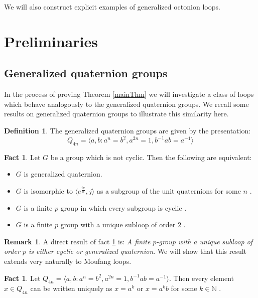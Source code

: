 \documentclass[12pt]{report}
\theoremstyle{definition}
\newtheorem{fct}[thm]{Fact}
\newtheorem{dfn}[thm]{Definition}
\newtheorem*{rmk}{Remark}
\newcommand{\NNN}{\mathbb{N}}
\begin{document}
We will also construct explicit examples of generalized octonion loops.


\section{Preliminaries}

\subsection{Generalized quaternion groups}

In the process of proving Theorem \ref{mainThm} we will investigate a class of loops which behave analogously
  to the generalized quaternion groups. We recall some results on generalized quaternion groups to illustrate
  this similarity here.

\begin{dfn}
  The generalized quaternion groups are given by the presentation:
  \[Q_{4n} = \langle a, b : a^n = b^2, a^{2n} = 1, b^{-1}ab = a^{-1}\rangle\]
\end{dfn}

\begin{fct}\label{fct:genQuat}
  Let $G$ be a group which is not cyclic. Then the following are equivalent:
  \begin{itemize}
    \item $G$ is generalized quaternion.
    \item $G$ is isomorphic to $\langle e^{\frac{i\pi}{n}}, j\rangle$ as a subgroup of the unit
      quaternions for some $n$ \cite{Brown}.
    \item $G$ is a finite $p$ group in which every subgroup is cyclic \cite{Cartan}.
    \item $G$ is a finite $p$ group with a unique subloop of order $2$ \cite{Brown}.
  \end{itemize}
\end{fct}

\begin{rmk}
  A direct result of fact \ref{fct:genQuat} is: \emph{A finite $p$-group with a unique subloop of order $p$ is
    either cyclic or generalized quaternion}. We will show that this result extends very naturally to Moufang loops.
\end{rmk}

\begin{fct}\label{fct:genQuat-rep}
  Let $Q_{4n} = \langle a, b : a^n = b^2, a^{2n} = 1, b^{-1}ab = a^{-1}\rangle$. Then every element $x \in Q_{4n}$
    can be written uniquely as $x = a^k$ or $x = a^k b$ for some $k\in\NNN$ \cite{genQuat}.
\end{fct}
\end{document}
